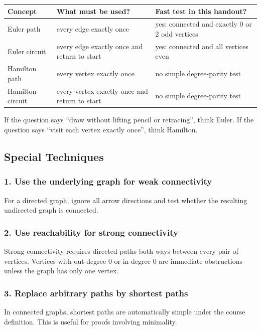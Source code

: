 \begin{center}
\small
\begin{tabular}{@{}p{}p{}p{}@{}}
\toprule
\textbf{Concept} & \textbf{What must be used?} & \textbf{Fast test in this handout?} \\
\midrule
Euler path & every edge exactly once & yes: connected and exactly \(0\) or \(2\) odd vertices \\
Euler circuit & every edge exactly once and return to start & yes: connected and all vertices even \\
Hamilton path & every vertex exactly once & no simple degree-parity test \\
Hamilton circuit & every vertex exactly once and return to start & no simple degree-parity test \\
\bottomrule
\end{tabular}
\end{center}

\begin{examtip}[title={Fast classification}]
If the question says ``draw without lifting pencil or retracing'', think Euler. If the question says ``visit each vertex exactly once'', think Hamilton.
\end{examtip}

\subsection{Special Techniques}

\subsubsection*{1. Use the underlying graph for weak connectivity}
For a directed graph, ignore all arrow directions and test whether the resulting undirected graph is connected.

\subsubsection*{2. Use reachability for strong connectivity}
Strong connectivity requires directed paths both ways between every pair of vertices. Vertices with out-degree \(0\) or in-degree \(0\) are immediate obstructions unless the graph has only one vertex.

\subsubsection*{3. Replace arbitrary paths by shortest paths}
In connected graphs, shortest paths are automatically simple under the course definition. This is useful for proofs involving minimality.

